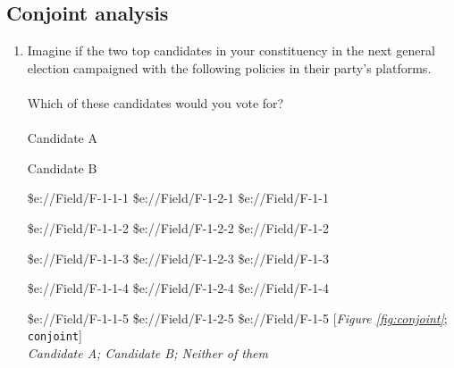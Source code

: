  \subsection*{Conjoint analysis} 
 \begin{enumerate}[resume] 
\item  \label{q:conjoint} Imagine if the two top candidates in your constituency in the next general election campaigned with the following policies in their party's platforms. \\\\Which of these candidates would you vote for?  
~\\


~\\




    Candidate A
    
    Candidate B
~


\${e://Field/F-1-1-1}
\${e://Field/F-1-2-1}
\${e://Field/F-1-1}

\${e://Field/F-1-1-2}
\${e://Field/F-1-2-2}
\${e://Field/F-1-2}

\${e://Field/F-1-1-3}
\${e://Field/F-1-2-3}
\${e://Field/F-1-3}

\${e://Field/F-1-1-4}
\${e://Field/F-1-2-4}
\${e://Field/F-1-4}

\${e://Field/F-1-1-5}
\${e://Field/F-1-2-5}
\${e://Field/F-1-5} [\textit{Figure \ref{fig:conjoint}}; 
\verb|conjoint|]
  \\ \textit{Candidate A; Candidate B; Neither of them}

\end{enumerate} 

